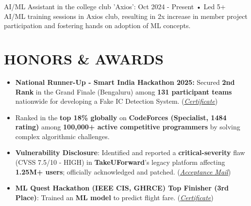 \documentclass[a4paper,10pt]{article}
\newcommand{\ulhref}[2]{\href{#1}{\uline{#2}}}
\begin{document}
AI/ML Assistant in the college club 'Axios’:	Oct 2024 - Present
•	Led 5+ AI/ML training sessions in Axios club, resulting in 2x increase in member project participation and fostering hands on adoption of ML concepts.


\section*{HONORS \& AWARDS} %
\begin{itemize}
    \item \textbf{National Runner-Up - Smart India Hackathon 2025:} Secured \textbf{2nd Rank} in the Grand Finale (Bengaluru) among \textbf{131 participant teams} nationwide for developing a Fake IC Detection System. (\textit{\ulhref{https://drive.google.com/file/d/1BJiUDBxGbbsS9Nt43kZePZgsTuKN0oX7/view?usp=sharing}{Certificate}})
    \item Ranked in the \textbf{top 18\% globally} on \textbf{CodeForces (Specialist, 1484 rating)} among \textbf{100,000+ active competitive programmers} by solving complex algorithmic challenges.
    \item \textbf{Vulnerability Disclosure}: Identified and reported a \textbf{critical-severity} flaw (CVSS 7.5/10 - HIGH) in \textbf{TakeUForward}'s legacy platform affecting \textbf{1.25M+ users}; officially acknowledged and patched. (\textit{\ulhref{https://drive.google.com/file/d/1L0xMoXyYOdKqCSoVcEP2x-3bJPw6NQFK/view?usp=sharing}{Acceptance Mail}})
    \item \textbf{ML Quest Hackathon (IEEE CIS, GHRCE) Top Finisher (3rd Place)}: Trained an \textbf{ML model} to predict flight fare. (\textit{\ulhref{https://drive.google.com/file/d/1L0xMoXyYOdKqCSoVcEP2x-3bJPw6NQFK/view?usp=sharing}{Certificate}})


\end{itemize}
\end{document}
